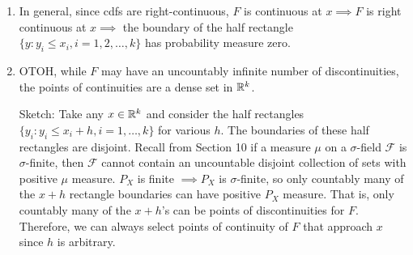 \documentclass[class=article,crop=false]{standalone}
\begin{document}
\begin{property}
\begin{enumerate}[label=\arabic*)]
	\item In general, since cdfs are right-continuous,  $ F$ is continuous at  $ x \implies F$ is right continuous at  $ x \implies$ the boundary of the half rectangle $ \{y:y_i\leq x_i, i=1,2,\ldots,k\} $ has probability measure zero. 
	\item OTOH, while $ F$ may have an uncountably infinite number of discontinuities, the points of continuities are a dense set in  $ \mathbb{R}^{k}$.
		\begin{prf}
			Sketch: Take any $ x \in \mathbb{R}^{k}$ and consider the half rectangles $ \{y_i: y_i\leq x_i + h, i=1,\ldots,k\} $ for various $ h$. The boundaries of these half rectangles are disjoint. Recall from Section 10 if a measure  $ \mu$ on a $\sigma$-field $ \mathcal{F}$ is $\sigma$-finite, then $ \mathcal{F}$ cannot contain an uncountable disjoint collection of sets with positive $ \mu$ measure. $ P_X$ is finite  $ \implies P_X$ is $\sigma$-finite, so only countably many of the $ x+h$ rectangle boundaries can have positive  $ P_X$ measure. That is, only countably many of the  $ x+h$'s can be points of discontinuities for  $ F$. Therefore, we can always select points of continuity of  $ F$ that approach  $ x$ since $ h$ is arbitrary.
		\end{prf}
\end{enumerate}
\end{property}
\end{document}
